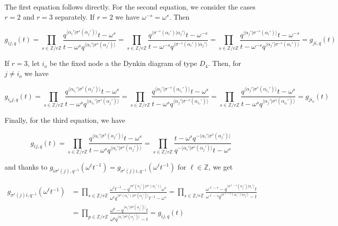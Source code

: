 \documentclass[12pt]{amsart}
\numberwithin{equation}{section}
\newcommand{\Z}{\ensuremath{\mathbb{Z}}}
\begin{document}
The first equation follows directly. For the second equation, we consider the cases $r=2$ and $r=3$ separately. If $r=2$ we have $\omega^{-s} = \omega^s$. Then

$$ g_{ij,q}(t) = \prod_{s\in \Z/r\Z} \frac{ q^{\langle \alpha_i' | \sigma^s(\alpha_j') \rangle}t-\omega^s}{ t - \omega^sq^{\langle \alpha_i' | \sigma^s(\alpha_j') \rangle}} = \prod_{s\in \Z/r\Z} \frac{ q^{\langle \sigma^{-s}(\alpha_i') | \alpha_j' \rangle}t-\omega^{-s}}{ t - \omega^{-s}q^{\langle \sigma^{-s}(\alpha_i') | \alpha_j' \rangle}} = \prod_{s\in \Z/r\Z} \frac{ q^{\langle \alpha_j'| \sigma^{-s}(\alpha_i') \rangle}t-\omega^{-s}}{ t - \omega^{-s}q^{\langle \alpha_j' | \sigma^{-s}(\alpha_i') \rangle}} = g_{ji,q}(t)$$

If $r=3$, let $i_o$ be the fixed node a the Dynkin diagram of type $D_4$. Then, for $j\neq i_o$ we have

$$ g_{i_oj,q}(t) = \prod_{s\in \Z/r\Z} \frac{ q^{\langle \alpha_{i_o}' | \sigma^s(\alpha_j') \rangle}t-\omega^s}{ t - \omega^sq^{\langle \alpha_{i_o}' | \sigma^s(\alpha_j') \rangle}}= \prod_{s\in \Z/r\Z} \frac{ q^{\langle \alpha_{j}' | \sigma^{-s}(\alpha_{i_o}') \rangle}t-\omega^s}{ t - \omega^sq^{\langle \alpha_{j}' | \sigma^{-s}(\alpha_{i_o}') \rangle}} = \prod_{s\in \Z/r\Z} \frac{ q^{\langle \alpha_{j}' | \sigma^{s}(\alpha_{i_o}') \rangle}t-\omega^s}{ t - \omega^sq^{\langle \alpha_{j}' | \sigma^{s}(\alpha_{i_o}') \rangle}} = g_{ji_o}(t)$$


Finally, for the third equation, we have

$$ g_{ij,q}(t) = \prod_{s\in \Z/r\Z} \frac{ q^{\langle \alpha_i' | \sigma^s(\alpha_j') \rangle}t-\omega^s}{t - \omega^sq^{\langle \alpha_i' | \sigma^s(\alpha_j') \rangle}} = \prod_{s\in \Z/r\Z} \frac{t  -\omega^sq^{-\langle \alpha_i' | \sigma^s(\alpha_j') \rangle}}{ q^{-\langle \alpha_i' | \sigma^s(\alpha_j') \rangle}t - \omega^s} $$

and thanks to $g_{i\sigma^\ell(j),q^{-1}}(\omega^{\ell}t^{-1}) = g_{\sigma^\ell(j)i,q^{-1}}(\omega^{\ell}t^{-1})$ for $\ell\in \Z$, we get

\begin{align*}  g_{\sigma^\ell(j)i,q^{-1}}(\omega^{\ell}t^{-1}) &= \prod_{s\in \Z/r\Z} \frac{\omega^{\ell}t^{-1}  -q^{\langle \sigma^{\ell}(\alpha_j') | \sigma^s(\alpha_{i}') \rangle}\omega^s}{\omega^{\ell} q^{\langle \sigma^{\ell}(\alpha_i') | \sigma^s(\alpha_{j}') \rangle}t^{-1} - \omega^s}  = \prod_{s\in \Z/r\Z} \frac{\omega^{\ell-s}  -q^{\langle \sigma^{\ell-s}(\alpha_j') | \alpha_{i}' \rangle}t}{\omega^{\ell-s} q^{\langle \sigma^{\ell-s}(\alpha_i') | \alpha_{j}' \rangle} - t} \\
&= \prod_{p\in \Z/r\Z} \frac{\omega^{p}-q^{\langle \alpha_i' |\sigma^{p}(\alpha_j') \rangle}t}{\omega^{p}q^{\langle \alpha_i' | \sigma^{p}(\alpha_j') \rangle} - t} = g_{ij,q}(t)
\end{align*}
\end{document}
